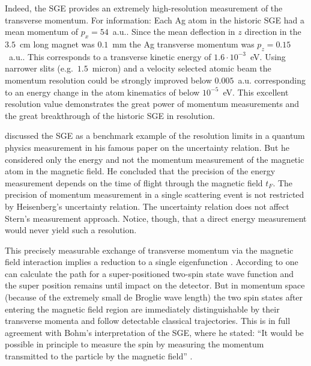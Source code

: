 \documentclass{article}
\begin{document}
Indeed, the SGE provides an extremely high-resolution measurement of the transverse momentum.  For information: Each Ag atom in the historic SGE had a mean momentum of $p_x = 54$~a.u.. Since the mean deflection in $z$ direction in the $3.5$~cm long magnet was $0.1$~mm the Ag transverse momentum was $p_z = 0.15$~a.u.. This corresponds to a transverse kinetic energy of $1.6\cdot10^{-3}$~eV. Using narrower slits (e.g.\ $1.5$~micron) and a velocity selected atomic beam the momentum resolution could be strongly improved below $0.005$~a.u. corresponding to an energy change in the atom kinematics of below $10^{-5}$~eV. This excellent resolution value demonstrates the great power of momentum measurements and the great breakthrough of the historic SGE in resolution. 

\cite{HeisenbergW1927Inhalt} discussed the SGE as a benchmark example of the resolution limits in a quantum physics measurement in his famous paper on the uncertainty relation. But he considered only the energy and not the momentum measurement of the magnetic atom in the magnetic field. He concluded that the precision of the energy measurement depends on the time of flight through the magnetic field $t_F$. The precision of momentum measurement in a single scattering event is not restricted by Heisenberg's uncertainty relation.  The uncertainty relation does not affect Stern's measurement approach. Notice, though, that a direct energy measurement would never yield such a resolution.

This precisely measurable exchange of transverse momentum via the magnetic field interaction implies a reduction to a single eigenfunction \citep{DevereuxM2015Reduction}. According to \cite[ch.~21]{BohmD1951Quantum} one can calculate the path for a super-positioned two-spin state wave function and the super position remains until impact on the detector. But in momentum space (because of the extremely small de Broglie wave length) the two spin states after entering the magnetic field region are immediately distinguishable by their transverse momenta and follow detectable classical trajectories. 
This is in full agreement with Bohm's interpretation of the SGE, where he stated: ``It would be possible in principle to measure the spin by measuring the momentum transmitted to the particle by the magnetic field'' \cite[p.~596]{BohmD1951Quantum}.
\end{document}
